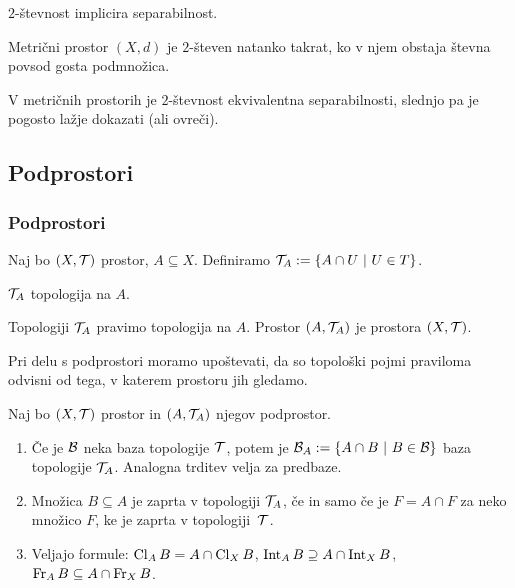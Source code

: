 \begin{trditev}
    $2$-števnost implicira separabilnost.
\end{trditev}

\begin{izrek}
    Metrični prostor $(X, d)$ je $2$-števen natanko takrat, ko v njem obstaja števna povsod gosta podmnožica.
\end{izrek}

\begin{opomba}
    V metričnih prostorih je $2$-števnost ekvivalentna separabilnosti, slednjo pa je pogosto lažje dokazati (ali ovreči).
\end{opomba}

\subsection{Podprostori}
\subsubsection{Podprostori}

Naj bo $(X, \mathcal{T})$ prostor, $A \subseteq X$. Definiramo $\mathcal{T}_A := \left\{A \cap U \ | \ U \in T\right\}$.

\begin{trditev}
    $\mathcal{T}_A$ topologija na $A$.
\end{trditev}

\begin{definicija}
    Topologiji $\mathcal{T}_A$ pravimo  topologija na $A$.
    Prostor $(A, \mathcal{T}_A)$ je  prostora $(X, \mathcal{T})$.
\end{definicija}

\begin{opomba}
    Pri delu s podprostori moramo upoštevati, da so topološki pojmi praviloma odvisni od tega, v katerem prostoru jih gledamo.
\end{opomba}

\begin{trditev}
    Naj bo $(X, \mathcal{T})$ prostor in $(A, \mathcal{T}_A)$ njegov podprostor.
    \begin{enumerate}
        \item Če je $\mathcal{B}$ neka baza topologije $\mathcal{T}$, potem je $\mathcal{B}_A := \left\{A \cap B \ | \ B \in \mathcal{B}\right\}$ baza topologije $\mathcal{T}_A$. Analogna trditev velja za predbaze.
        \item Množica $B \subseteq A$ je zaprta v topologiji $\mathcal{T}_A$, če in samo če je $F = A \cap F$ za neko množico $F$, ke je zaprta v topologiji~$\mathcal{T}$.
        \item Veljajo formule: $\operatorname{Cl}_A B = A \cap \operatorname{Cl}_X B$, $\operatorname{Int}_A B \supseteq A \cap \operatorname{Int}_X B$, $\operatorname{Fr}_A B \subseteq A \cap \operatorname{Fr}_X B$.
    \end{enumerate}    
\end{trditev}

